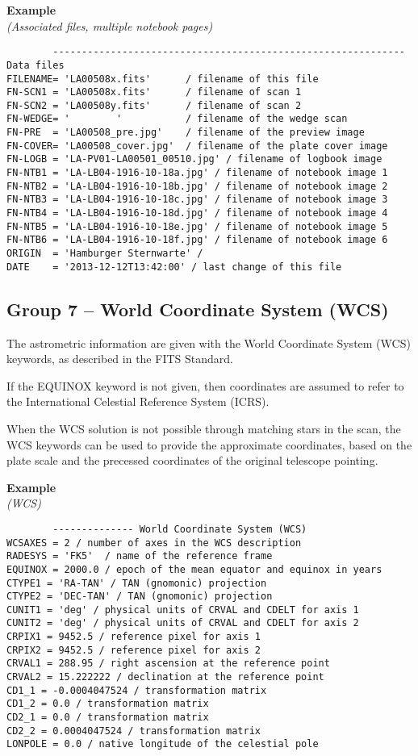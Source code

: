 \documentclass[11pt]{ivoa}
\newenvironment{fitsexample}[1]
{\bigskip\noindent\textbf{Example}\\\textit{(#1\smallskip)}}
{\medskip}
\begin{document}
\begin{fitsexample}{Associated files, multiple notebook pages}
\begin{lstlisting}
        ------------------------------------------------------------- Data files
FILENAME= 'LA00508x.fits'      / filename of this file
FN-SCN1 = 'LA00508x.fits'      / filename of scan 1
FN-SCN2 = 'LA00508y.fits'      / filename of scan 2
FN-WEDGE= '        '           / filename of the wedge scan
FN-PRE  = 'LA00508_pre.jpg'    / filename of the preview image
FN-COVER= 'LA00508_cover.jpg'  / filename of the plate cover image
FN-LOGB = 'LA-PV01-LA00501_00510.jpg' / filename of logbook image
FN-NTB1 = 'LA-LB04-1916-10-18a.jpg' / filename of notebook image 1
FN-NTB2 = 'LA-LB04-1916-10-18b.jpg' / filename of notebook image 2
FN-NTB3 = 'LA-LB04-1916-10-18c.jpg' / filename of notebook image 3
FN-NTB4 = 'LA-LB04-1916-10-18d.jpg' / filename of notebook image 4
FN-NTB5 = 'LA-LB04-1916-10-18e.jpg' / filename of notebook image 5
FN-NTB6 = 'LA-LB04-1916-10-18f.jpg' / filename of notebook image 6
ORIGIN  = 'Hamburger Sternwarte' /
DATE    = '2013-12-12T13:42:00' / last change of this file
\end{lstlisting}
\end{fitsexample}

\subsection{Group 7 – World Coordinate System (WCS)}

The astrometric information are given with the World Coordinate System
(WCS) keywords, as described in the FITS Standard.

If the EQUINOX keyword is not given, then coordinates are assumed to
refer to the International Celestial Reference System (ICRS).

When the WCS solution is not possible through matching stars in the
scan, the WCS keywords can be used to provide the approximate
coordinates, based on the plate scale and the precessed coordinates of
the original telescope pointing.


\begin{fitsexample}{WCS}
\begin{lstlisting}
        -------------- World Coordinate System (WCS)
WCSAXES = 2 / number of axes in the WCS description
RADESYS = 'FK5'  / name of the reference frame
EQUINOX = 2000.0 / epoch of the mean equator and equinox in years
CTYPE1 = 'RA-TAN' / TAN (gnomonic) projection
CTYPE2 = 'DEC-TAN' / TAN (gnomonic) projection
CUNIT1 = 'deg' / physical units of CRVAL and CDELT for axis 1
CUNIT2 = 'deg' / physical units of CRVAL and CDELT for axis 2
CRPIX1 = 9452.5 / reference pixel for axis 1
CRPIX2 = 9452.5 / reference pixel for axis 2
CRVAL1 = 288.95 / right ascension at the reference point
CRVAL2 = 15.222222 / declination at the reference point
CD1_1 = -0.0004047524 / transformation matrix
CD1_2 = 0.0 / transformation matrix
CD2_1 = 0.0 / transformation matrix
CD2_2 = 0.0004047524 / transformation matrix
LONPOLE = 0.0 / native longitude of the celestial pole
\end{lstlisting}
\end{fitsexample}
\end{document}
